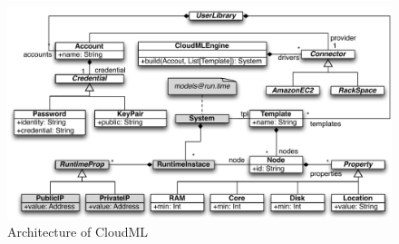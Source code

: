 \begin{figure}
  \includegraphics[width=\textwidth]{figs/architecture.pdf}
  \caption{Architecture of CloudML}
  \label{fig:architecture}
\end{figure}
